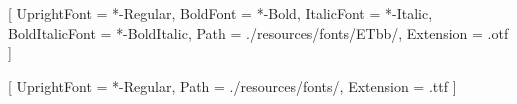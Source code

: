 




\setmainfont{ETbb}[
  UprightFont = {*-Regular},
  BoldFont = {*-Bold},
  ItalicFont = {*-Italic},
  BoldItalicFont = {*-BoldItalic},
  Path = {./resources/fonts/ETbb/},
  Extension = {.otf}
]

\setsansfont{SourceSansPro}[
  UprightFont = {*-Regular},
  Path = {./resources/fonts/},
  Extension = {.ttf}
]


\usepackage{amsmath}
\usepackage{unicode-math}


\renewcommand{\partformat}{\thepart}

\newcommand*\partgeometry[1]
  {\newgeometry{marginparwidth=0cm,marginparsep=0cm,showframe,inner=0cm,outer=0cm}}
\let\originalpartheademptypage\partheademptypage
\renewcommand\partheademptypage
  {\originalpartheademptypage\restoregeometry}

